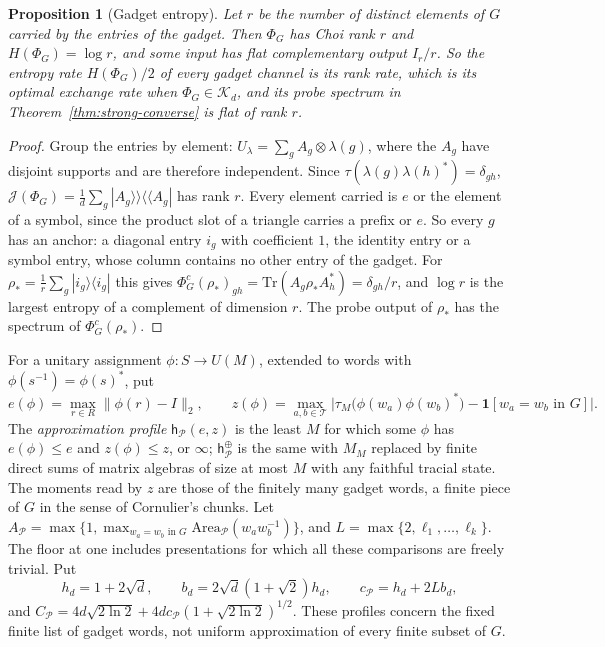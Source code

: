 \documentclass[11pt,a4paper]{article}
\theoremstyle{plain}
\newtheorem{proposition}[theorem]{Proposition}
\theoremstyle{definition}
\theoremstyle{remark}
\begin{document}
\begin{proposition}[Gadget entropy]\label{prop:gadget-entropy}
Let $r$ be the number of distinct elements of $G$ carried by the entries of the gadget. Then $\Phi_G$ has Choi rank $r$ and $H(\Phi_G)=\log r$, and some
input has flat complementary output $I_r/r$. So the entropy rate $H(\Phi_G)/2$ of every gadget channel is its rank rate, which is its optimal
exchange rate when $\Phi_G\in\mathcal K_d$, and its probe spectrum in Theorem~\ref{thm:strong-converse} is flat of rank $r$.
\end{proposition}

\begin{proof}
Group the entries by element: $U_\lambda=\sum_gA_g\otimes\lambda(g)$, where the $A_g$ have disjoint supports and are therefore independent. Since
$\tau(\lambda(g)\lambda(h)^*)=\delta_{gh}$, $\mathcal J(\Phi_G)=\frac1d\sum_g|A_g\rangle\!\rangle\langle\!\langle A_g|$ has rank $r$. Every element carried is $e$ or the element of a
symbol, since the product slot of a triangle carries a prefix or $e$. So every $g$ has an anchor: a diagonal entry $i_g$ with coefficient $1$, the
identity entry or a symbol entry, whose column contains no other entry of the gadget. For $\rho_*=\frac1r\sum_g|i_g\rangle\langle i_g|$ this gives
$\Phi_G^c(\rho_*)_{gh}=\mathrm{Tr}(A_g\rho_*A_h^*)=\delta_{gh}/r$, and $\log r$ is the largest entropy of a complement of dimension $r$. The probe output of
$\rho_*$ has the spectrum of $\Phi_G^c(\rho_*)$.
\end{proof}

For a unitary assignment $\phi:S\to U(M)$, extended to words with $\phi(s^{-1})=\phi(s)^*$, put
\[
e(\phi)=\max_{r\in R}\|\phi(r)-I\|_2,\qquad z(\phi)=\max_{a,b\in\mathcal T}\big|\tau_M\big(\phi(w_a)\phi(w_b)^*\big)-\mathbf 1[w_a=w_b\text{ in }G]\big| .
\]
The \emph{approximation profile} $\mathsf h_{\mathcal P}(e,z)$ is the least $M$ for which some $\phi$ has $e(\phi)\le e$ and $z(\phi)\le z$, or $\infty$; $\mathsf h^\oplus_{\mathcal P}$ is the
same with $M_M$ replaced by finite direct sums of matrix algebras of size at most $M$ with any faithful tracial state. The moments read by $z$
are those of the finitely many gadget words, a finite piece of $G$ in the sense of Cornulier's chunks. Let
$A_{\mathcal P}=\max\{1,\max_{w_a=w_b\text{ in }G}\mathrm{Area}_{\mathcal P}(w_aw_b^{-1})\}$,
and $L=\max\{2,\ell_1,\dots,\ell_k\}$. The floor at one includes presentations for which all these comparisons are freely trivial. Put
\[
h_d=1+2\sqrt d,\qquad b_d=2\sqrt d(1+\sqrt2)h_d,\qquad c_{\mathcal P}=h_d+2Lb_d,
\]
and $C_{\mathcal P}=4d\sqrt{2\ln2}+4dc_{\mathcal P}(1+\sqrt{2\ln2})^{1/2}$.
These profiles concern the fixed finite list of gadget words, not uniform approximation of every finite subset of $G$.
\end{document}
